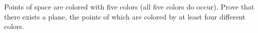 Points of space are colored with five colors (all five colors do occur). Prove that there exists a plane, the points of which are colored by at least four different colors.
